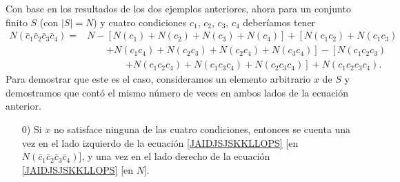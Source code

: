 \begin{myexample}
\begin{minipage}[r]{0.22\textwidth}
\begin{center}
            \label{UAISISKKJJBJKOSPPIIW}
        \end{center}
    \end{minipage}
\end{myexample}

\begin{myexample}
    Con base en los resultados de los dos ejemplos anteriores, ahora para un conjunto finito $S$ (con $|S| = N$) y cuatro condiciones $c_1$, $c_2$, $c_3$, $c_4$ deberíamos tener
    \begin{equation}
        \begin{array}{rl}
            N \left( \bar{c}_1 \bar{c}_2 \bar{c}_3 \bar{c}_4 \right) = & \!\!\!\! N - \left[ N \left( c_1 \right) + N \left( c_2 \right) + N \left( c_3 \right) + N \left( c_4 \right) \right] + \left[ N \left( c_1 c_2 \right) + N\left( c_1 c_3 \right) \right. \\
            & \quad\quad \left. + N\left( c_1 c_4 \right) + N\left( c_2 c_3 \right) + N\left( c_2 c_4 \right) + N\left( c_3 c_4 \right) \right] - \left[ N \left( c_1 c_2 c_3 \right)  \right. \\
            & \quad\quad\quad\quad \left. + N \left( c_1 c_2 c_4 \right) + N \left( c_1 c_3 c_4 \right) + N \left( c_2 c_3 c_4 \right) \right] + N\left( c_1 c_2 c_3 c_4 \right) .
        \end{array} \label{JAIDJSJSKKLLOPS}
    \end{equation}
    Para demostrar que este es el caso, consideramos un elemento arbitrario $x$ de $S$ y demostramos que contó el mismo número de veces en ambos lados de la ecuación anterior.
    \begin{enumerate}[label=\arabic*)]
        \item[0)] Si $x$ no satisface ninguna de las cuatro condiciones, entonces se cuenta una vez en el lado izquierdo de la ecuación \eqref{JAIDJSJSKKLLOPS} [en $N\left(\bar{c}_1 \bar{c}_2 \bar{c}_3 \bar{c}_4\right)$], y una vez en el lado derecho de la ecuación \eqref{JAIDJSJSKKLLOPS} [en $N$].

\end{enumerate}
\end{myexample}
